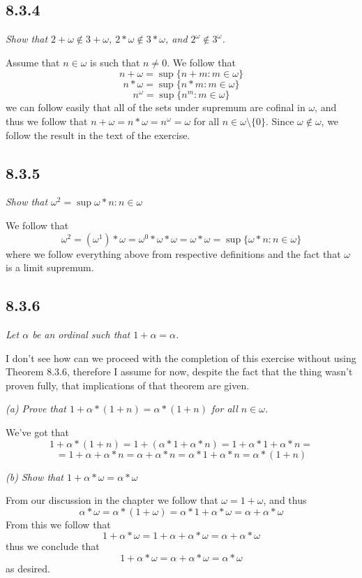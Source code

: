 \documentclass[11pt,oneside,titlepage]{book}
\newcommand{\set}[1]{\{ #1 \}}
\begin{document}
\subsection*{8.3.4}

\textit{Show that $2 + \omega \notin 3 + \omega$, $2 * \omega \notin 3 * \omega$,
  and $2^\omega \notin 3^\omega$. }

Assume that $n \in \omega$ is such that $n \neq 0$. We follow that
$$n + \omega = \sup\set{n + m: m \in \omega}$$
$$n * \omega = \sup\set{n * m: m \in \omega}$$
$$n^\omega = \sup\set{n^m: m \in \omega}$$
we can follow easily that all of the sets under supremum are cofinal in $\omega$,
and thus we follow that $n + \omega = n * \omega = n^\omega = \omega$ for all
$n \in \omega \setminus \set{0}$. Since $\omega \notin \omega$, we follow the result
in the text of the exercise.

\subsection*{8.3.5}

\textit{Show that $\omega^2 = \sup{\omega * n: n \in \omega}$}

We follow that
$$\omega^2 = (\omega^1) * \omega = \omega^0 * \omega * \omega = \omega * \omega =
\sup\set{\omega * n: n \in \omega}$$
where we follow everything above from respective definitions and the fact that
$\omega$ is a limit supremum.

\subsection*{8.3.6}

\textit{Let $\alpha$ be an ordinal such that $1 + \alpha = \alpha$. }

I don't see how can we proceed with the completion of this exercise without
using Theorem 8.3.6, therefore I assume for now, despite the fact that the thing wasn't
proven fully, that implications of that theorem are given.

\textit{(a) Prove that $1 + \alpha * (1 + n) = \alpha * (1 + n)$ for all $n \in \omega$.}

We've got that
$$1 + \alpha * (1 + n) = 1 + (\alpha * 1 + \alpha * n) = 1 + \alpha * 1 + \alpha * n = $$
$$ = 
1 + \alpha + \alpha * n = \alpha + \alpha * n = \alpha * 1 + \alpha * n = \alpha * (1 + n)$$

\textit{(b) Show that $1 + \alpha * \omega = \alpha * \omega$}

From our discussion in the chapter we follow that $\omega = 1 + \omega$, and thus 
$$\alpha * \omega = \alpha * (1 + \omega) = \alpha * 1 + \alpha * \omega =
\alpha + \alpha * \omega$$
From this we follow that 
$$1 + \alpha * \omega = 1 + \alpha + \alpha * \omega = \alpha + \alpha * \omega$$
thus we conclude that
$$1 + \alpha * \omega = \alpha + \alpha * \omega = \alpha * \omega$$
as desired.
\end{document}
